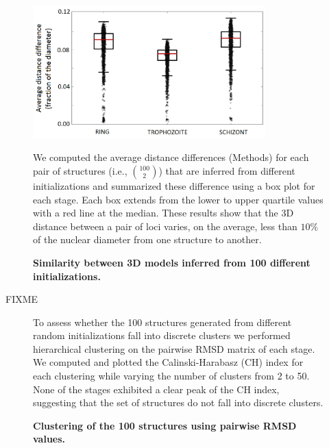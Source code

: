 \begin{figure}
  \begin{center}
  \includegraphics[width=0.8\textwidth]{suppFigs/stabilityOf3Dinference/compareStructurePairs.png}
   \end{center}
\caption{{\bf Similarity between 3D models inferred from 100 different initializations.}}
{We computed the average distance differences (Methods) for each pair of structures
(i.e., ${100 \choose 2}$) that are inferred from different initializations and
summarized these difference using a box plot for each stage. Each box extends from the
lower to upper quartile values with a red line at the median. These results show that
the 3D distance between a pair of loci varies, on the average, less than $10\%$ of the
nuclear diameter from one structure to another.
}
\label{suppfig:compareStructurePairs}
\end{figure}
\clearpage

FIXME
\begin{figure}
  \begin{center}
   \hspace{0.15\textwidth}
  \hspace{0.15\textwidth}
   \end{center}
\caption{{\bf Clustering of the 100 structures using pairwise RMSD values.}}
{ To assess whether the 100 structures generated from different random initializations fall into 
discrete clusters we performed hierarchical clustering on the pairwise RMSD matrix of each 
stage. We computed and plotted the Calinski-Harabasz (CH) 
index \cite{calinski:dendrite} for each clustering while varying the number of clusters from 2 to 50. 
None of the stages exhibited a clear peak of the CH index, suggesting that the set of structures do not fall into discrete clusters.
}
\label{suppfig:CHindices}
\end{figure}
\clearpage


